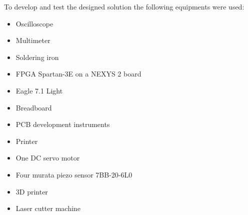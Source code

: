 To develop and test the designed solution the following equipments were used:
\begin{itemize}
	\item Oscilloscope
	\item Multimeter
	\item Soldering iron
	\item FPGA Spartan-3E on a NEXYS 2 board
	\item Eagle 7.1 Light
	\item Breadboard
	\item PCB development instruments
	\item Printer
	\item One DC servo motor
	\item Four murata piezo sensor 7BB-20-6L0
	\item 3D printer
	\item Laser cutter machine
\end{itemize}